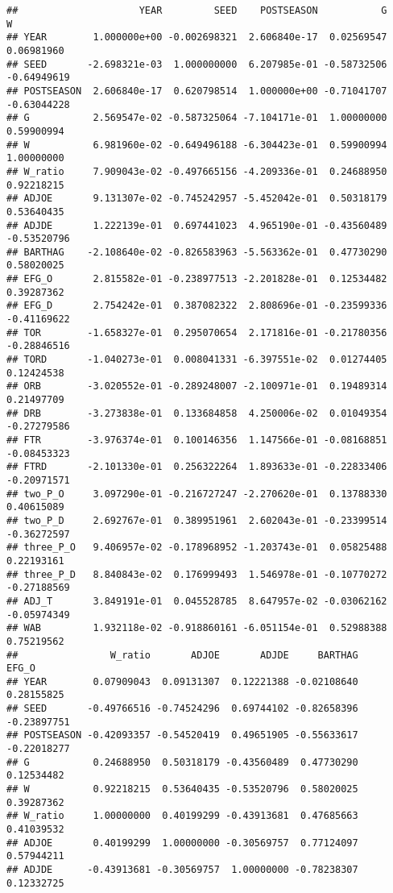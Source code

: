 \documentclass[
]{article}
\begin{document}
\begin{verbatim}
##                     YEAR         SEED    POSTSEASON           G           W
## YEAR        1.000000e+00 -0.002698321  2.606840e-17  0.02569547  0.06981960
## SEED       -2.698321e-03  1.000000000  6.207985e-01 -0.58732506 -0.64949619
## POSTSEASON  2.606840e-17  0.620798514  1.000000e+00 -0.71041707 -0.63044228
## G           2.569547e-02 -0.587325064 -7.104171e-01  1.00000000  0.59900994
## W           6.981960e-02 -0.649496188 -6.304423e-01  0.59900994  1.00000000
## W_ratio     7.909043e-02 -0.497665156 -4.209336e-01  0.24688950  0.92218215
## ADJOE       9.131307e-02 -0.745242957 -5.452042e-01  0.50318179  0.53640435
## ADJDE       1.222139e-01  0.697441023  4.965190e-01 -0.43560489 -0.53520796
## BARTHAG    -2.108640e-02 -0.826583963 -5.563362e-01  0.47730290  0.58020025
## EFG_O       2.815582e-01 -0.238977513 -2.201828e-01  0.12534482  0.39287362
## EFG_D       2.754242e-01  0.387082322  2.808696e-01 -0.23599336 -0.41169622
## TOR        -1.658327e-01  0.295070654  2.171816e-01 -0.21780356 -0.28846516
## TORD       -1.040273e-01  0.008041331 -6.397551e-02  0.01274405  0.12424538
## ORB        -3.020552e-01 -0.289248007 -2.100971e-01  0.19489314  0.21497709
## DRB        -3.273838e-01  0.133684858  4.250006e-02  0.01049354 -0.27279586
## FTR        -3.976374e-01  0.100146356  1.147566e-01 -0.08168851 -0.08453323
## FTRD       -2.101330e-01  0.256322264  1.893633e-01 -0.22833406 -0.20971571
## two_P_O     3.097290e-01 -0.216727247 -2.270620e-01  0.13788330  0.40615089
## two_P_D     2.692767e-01  0.389951961  2.602043e-01 -0.23399514 -0.36272597
## three_P_O   9.406957e-02 -0.178968952 -1.203743e-01  0.05825488  0.22193161
## three_P_D   8.840843e-02  0.176999493  1.546978e-01 -0.10770272 -0.27188569
## ADJ_T       3.849191e-01  0.045528785  8.647957e-02 -0.03062162 -0.05974349
## WAB         1.932118e-02 -0.918860161 -6.051154e-01  0.52988388  0.75219562
##                W_ratio       ADJOE       ADJDE     BARTHAG       EFG_O
## YEAR        0.07909043  0.09131307  0.12221388 -0.02108640  0.28155825
## SEED       -0.49766516 -0.74524296  0.69744102 -0.82658396 -0.23897751
## POSTSEASON -0.42093357 -0.54520419  0.49651905 -0.55633617 -0.22018277
## G           0.24688950  0.50318179 -0.43560489  0.47730290  0.12534482
## W           0.92218215  0.53640435 -0.53520796  0.58020025  0.39287362
## W_ratio     1.00000000  0.40199299 -0.43913681  0.47685663  0.41039532
## ADJOE       0.40199299  1.00000000 -0.30569757  0.77124097  0.57944211
## ADJDE      -0.43913681 -0.30569757  1.00000000 -0.78238307  0.12332725

\end{verbatim}
\end{document}
